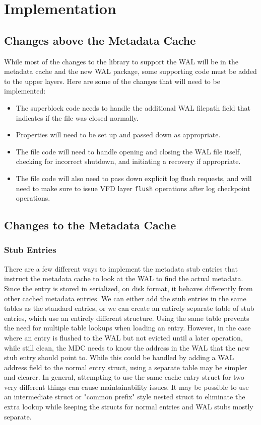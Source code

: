\section{Implementation}
\label{sec:implementation}

\subsection{Changes above the Metadata Cache}

While most of the changes to the library to support the WAL will be in the metadata cache and the new WAL package, some supporting code must be added to the upper layers. Here are some of the changes that will need to be implemented:

\begin{itemize}
    \item The superblock code needs to handle the additional WAL filepath field that indicates if the file was closed normally.
    \item Properties will need to be set up and passed down as appropriate.
    \item The file code will need to handle opening and closing the WAL file itself, checking for incorrect shutdown, and initiating a recovery if appropriate.
    \item The file code will also need to pass down explicit log flush requests, and will need to make sure to issue VFD layer \texttt{flush} operations after log checkpoint operations.
\end{itemize}

\subsection{Changes to the Metadata Cache}

\subsubsection{Stub Entries}

There are a few different ways to implement the metadata stub entries that instruct the metadata cache to look at the WAL to find the actual metadata. Since the entry is stored in serialized, on disk format, it behaves differently from other cached metadata entries. We can either add the stub entries in the same tables as the standard entries, or we can create an entirely separate table of stub entries, which use an entirely different structure. Using the same table prevents the need for multiple table lookups when loading an entry. However, in the case where an entry is flushed to the WAL but not evicted until a later operation, while still clean, the MDC needs to know the address in the WAL that the new stub entry should point to. While this could be handled by adding a WAL address field to the normal entry struct, using a separate table may be simpler and clearer. In general, attempting to use the same cache entry struct for two very different things can cause maintainability issues. It may be possible to use an intermediate struct or "common prefix" style nested struct to eliminate the extra lookup while keeping the structs for normal entries and WAL stubs mostly separate.

